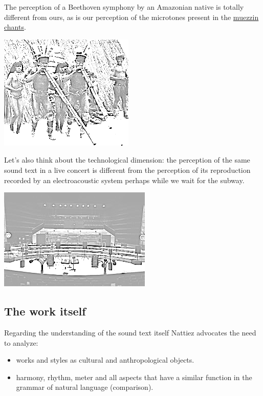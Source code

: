 The perception of a Beethoven symphony by an Amazonian native is totally different from ours, as is our perception of the microtones present in the \href{muezzin.mp3}{muezzin chants}.

\begin{center}
\includegraphics[scale=0.6]{../img/indigeni.png}
\end{center}

Let's also think about the technological dimension: the perception of the same sound text in a live concert is different from the perception of its reproduction recorded by an electroacoustic system perhaps while we wait for the subway.

\begin{center}
\includegraphics[scale=0.6]{../img/acousma.png}
\end{center}

\subsection{The work itself}\label{the-work-itself}

Regarding the understanding of the sound text itself Nattiez advocates the need to analyze: 
\begin{itemize}
\item works and styles as cultural and anthropological objects. 
\item harmony, rhythm, meter and all aspects that have a similar function in the grammar of natural language (comparison).
\end{itemize}

